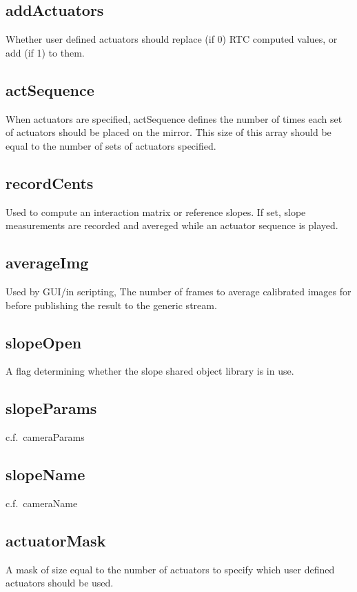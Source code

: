 \documentclass[a4,10pt]{article}
\begin{document}
\subsection{addActuators}
Whether user defined actuators should replace (if 0) RTC computed
values, or add (if 1) to them.

\subsection{actSequence}
When actuators are specified, actSequence defines the number of times
each set of actuators should be placed on the mirror.  This size of
this array should be equal to the number of sets of actuators
specified.

\subsection{recordCents}
Used to compute an interaction matrix or reference slopes.  If set,
slope measurements are recorded and avereged while an actuator
sequence is played.


\subsection{averageImg}
Used by GUI/in scripting, The number of frames to average calibrated
images for before publishing the result to the generic stream.

\subsection{slopeOpen}
A flag determining whether the slope
shared object library is in use.

\subsection{slopeParams}
c.f.\ cameraParams

\subsection{slopeName}
c.f.\ cameraName

\subsection{actuatorMask}
A mask of size equal to the number of actuators to specify which user
defined actuators should be used.
\end{document}
